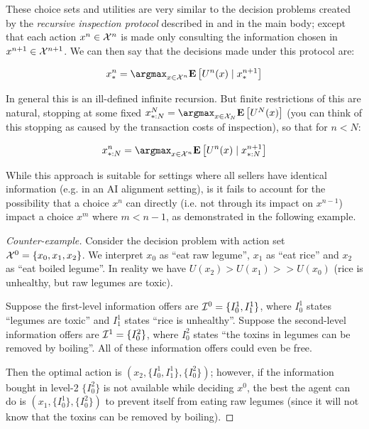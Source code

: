 These choice sets and utilities are very similar to the decision problems created by the \emph{recursive inspection protocol} described in  and in the main body; except that each action $x^n\in\mathcal{X}^n$ is made only consulting the information chosen in $x^{n+1}\in\mathcal{X}^{n+1}$. We can then say that the decisions made under this protocol are:

\begin{equation}
x^n_*=\argmax_{x\in\Actions^n} \Expectof{
  U^n(x)\mid x^{n+1}_*
}
\label{eq:rim-choices}
\end{equation}

In general this is an ill-defined infinite recursion. But finite restrictions of this are natural, stopping at some fixed $x^N_{*:N}=\argmax_{x\in\Actions_N}\Expectof{U^N(x)}$ (you can think of this stopping as caused by the transaction costs of inspection), so that for $n<N$:

\begin{equation}
x^n_{*:N}=\argmax_{x\in\Actions^n} \Expectof{
  U^n(x)\mid x^{n+1}_{*:N}
}
\label{eq:rim-choices-fin}
\end{equation}

While this approach is suitable for settings where all sellers have identical information (e.g. in an AI alignment setting), is it fails to account for the possibility that a choice $x^n$ can directly (i.e. not through its impact on $x^{n-1}$) impact a choice $x^m$ where $m<n-1$, as demonstrated in the following example.

\begin{proof}[Counter-example]
Consider the decision problem with action set $\mathcal{X}^0=\{x_0, x_1, x_2\}$. We interpret $x_0$ as ``eat raw legume'', $x_1$ as ``eat rice'' and $x_2$ as ``eat boiled legume''. In reality we have $U(x_2)>U(x_1)>>U(x_0)$ (rice is unhealthy, but raw legumes are toxic).

Suppose the first-level information offers are $\mathcal{I}^0=\{I^1_0,I^1_1\}$, where $I^1_0$ states ``legumes are toxic'' and $I^1_1$ states ``rice is unhealthy''. Suppose the second-level information offers are $\mathcal{I}^1=\{I^2_0\}$, where $I^2_0$ states ``the toxins in legumes can be removed by boiling''. All of these information offers could even be free.

Then the optimal action is $(x_2,\{I^1_0,I^1_1\},\{I^2_0\})$; however, if the information bought in level-2 $\{I^2_0\}$ is not available while deciding $x^0$, the best the agent can do is $(x_1,\{I^1_0\},\{I^2_0\})$ to prevent itself from eating raw legumes (since it will not know that the toxins can be removed by boiling).
\end{proof}




